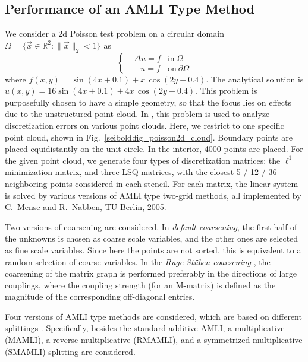 \documentclass[reqno]{amsart}
\theoremstyle{plain}
\theoremstyle{definition}
\theoremstyle{remark}
\begin{document}
\subsection{Performance of an AMLI Type Method}
\label{seibold:subsec:performance_amli}
We consider a 2d Poisson test problem on a circular domain
$\Omega = \{\vec{x}\in\mathbb{R}^2:\|\vec{x}\|_2<1\}$ as
\begin{equation*}
\begin{cases}
  -\Delta u = f &\mathrm{in~}\Omega \\
\quad\;\; u = f &\mathrm{on~}\partial\Omega
\end{cases}
\end{equation*}
where $f(x,y) = \sin(4x+0.1)+x\,\cos(2y+0.4)$.
The analytical solution is $u(x,y) = 16\sin(4x+0.1)+4x\,\cos(2y+0.4)$.
This problem is purposefully chosen to have a simple geometry, so that the focus lies
on effects due to the unstructured point cloud. In \cite[p.~173]{SeiboldDiss2006},
this problem is used to analyze discretization errors on various point clouds.
Here, we restrict to one specific point cloud, shown in
Fig.~\ref{seibold:fig_poisson2d_cloud}. Boundary points are placed equidistantly
on the unit circle. In the interior, 4000 points are placed.
For the given point cloud, we generate four
types of discretization matrices: the $\ell^1$ minimization matrix, and three LSQ
matrices, with the closest 5 / 12 / 36 neighboring points considered in each stencil.
For each matrix, the linear system is solved by various versions of AMLI type two-grid
methods, all implemented by C.~Mense and R.~Nabben, TU Berlin, 2005.

Two versions of coarsening are considered.
In \emph{default coarsening}, the first half of the unknowns is chosen as coarse scale
variables, and the other ones are selected as fine scale variables. Since here the
points are not sorted, this is equivalent to a random selection of coarse variables.
In the \emph{Ruge-St{\"u}ben coarsening} \cite{RugeStueben1987}, the coarsening of the
matrix graph is performed preferably in the directions of large couplings, where the
coupling strength (for an M-matrix) is defined as the magnitude of the corresponding
off-diagonal entries.

Four versions of AMLI type methods are considered, which are based on different
splittings \cite{MenseNabben2008_1,MenseNabben2008_2}.
Specifically, besides the standard additive AMLI, a multiplicative (MAMLI),
a reverse multiplicative (RMAMLI), and a symmetrized multiplicative (SMAMLI) splitting
are considered.
\end{document}
